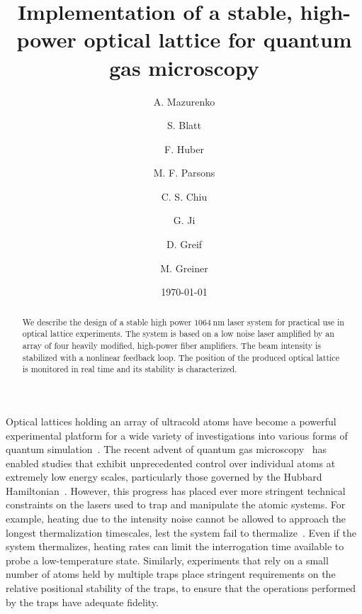 \documentclass[twocolumn,aps,pra,showpacs,preprintnumbers,bibnotes]{revtex4-1}
\newcommand\unit[2]{\ensuremath{#1~\mathrm{{#2}}}}
\begin{document}
\title{Implementation of a stable, high-power optical lattice for quantum gas microscopy}

\author{A. Mazurenko}
\author{S. Blatt}
\author{F. Huber}
\author{M. F. Parsons}
\author{C. S. Chiu}
\author{G. Ji}
\author{D. Greif}
\author{M. Greiner}

\date{\today}
\begin{abstract}
 We describe the design of a stable high power \unit{1064}{nm} laser system for practical use in optical lattice experiments. The system is based on a low noise laser amplified by an array of four heavily modified, high-power fiber amplifiers. The beam intensity is stabilized with a nonlinear feedback loop. The position of the produced optical lattice is monitored in real time and its stability is characterized.
\end{abstract}
\maketitle

Optical lattices holding an array of ultracold atoms have become a powerful experimental platform for a wide variety of investigations into various forms of quantum simulation~\cite{Friedenauer2008, Kim2010, Struck2011, Simon2011, Yan2013, Drewes2016, Murmann2015}.
The recent advent of quantum gas microscopy~\cite{Bakr2009, Sherson2010, Haller2015, Cheuk2015, Parsons2015, Edge2015, Omran2015, Greif2016, Cheuk2016, Parsons2016, Boll2016, Cheuk2016a, Brown2016} has enabled studies that exhibit unprecedented control over individual atoms at extremely low energy scales, particularly those governed by the Hubbard Hamiltonian~\cite{Hubbard1963}.
However, this progress has placed ever more stringent technical constraints on the lasers used to trap and manipulate the atomic systems.
For example, heating due to the intensity noise cannot be allowed to approach the longest thermalization timescales, lest the system fail to thermalize~\cite{Savard1997}.
Even if the system thermalizes, heating rates can limit the interrogation time available to probe a low-temperature state.
Similarly, experiments that rely on a small number of atoms held by multiple traps place stringent requirements on the relative positional stability of the traps, to ensure that the operations performed by the traps have adequate fidelity.
\end{document}
